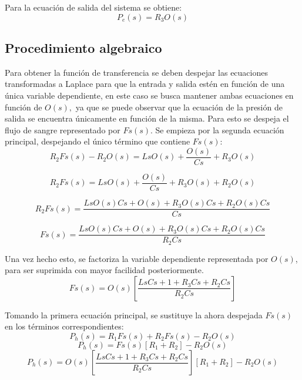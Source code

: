 \documentclass[letterpaper,11pt]{article}
\begin{document}
Para la ecuaci\'{o}n de salida del sistema se obtiene:%
\begin{equation*}
P_{e}(s)=R_{3}O(s)
\end{equation*}

\subsection{Procedimiento algebraico}

Para obtener la funci\'{o}n de transferencia se deben despejar las
ecuaciones transformadas a Laplace para que la entrada y salida est\'{e}n en
funci\'{o}n de una \'{u}nica variable dependiente, en este caso se busca
mantener ambas ecuaciones en funci\'{o}n de $O(s),$ ya que se puede observar
que la ecuaci\'{o}n de la presi\'{o}n de salida se encuentra \'{u}nicamente
en funci\'{o}n de la misma. Para esto se despeja el flujo de sangre
representado por $Fs(s)$. Se empieza por la segunda ecuaci\'{o}n principal,
despejando el \'{u}nico t\'{e}rmino que contiene $Fs(s)$:%
\begin{equation}
R_{2}Fs(s)-R_{2}O(s)=LsO(s)+\frac{O(s)}{Cs}+R_{3}O(s)
\end{equation}

\begin{equation*}
R_{2}Fs(s)=LsO(s)+\frac{O(s)}{Cs}+R_{3}O(s)+R_{2}O(s)
\end{equation*}

\begin{equation*}
R_{2}Fs(s)=\frac{LsO(s)Cs+O(s)+R_{3}O(s)Cs+R_{2}O(s)Cs}{Cs}
\end{equation*}

\begin{equation*}
Fs(s)=\frac{LsO(s)Cs+O(s)+R_{3}O(s)Cs+R_{2}O(s)Cs}{R_{2}Cs}
\end{equation*}

Una vez hecho esto, se factoriza la variable dependiente representada por $%
O(s)$, para ser suprimida con mayor facilidad posteriormente.%
\begin{equation*}
Fs(s)=O(s)\left[ \frac{LsCs+1+R_{3}Cs+R_{2}Cs}{R_{2}Cs}\right] 
\end{equation*}

Tomando la primera ecuaci\'{o}n principal, se sustituye la ahora despejada $%
Fs(s)$ en los t\'{e}rminos correspondientes:%
\begin{equation*}
P_{h}(s)=R_{1}Fs(s)+R_{2}Fs(s)-R_{2}O(s)
\end{equation*}%
\begin{equation*}
P_{h}(s)=Fs(s)\left[ R_{1}+R_{2}\right] -R_{2}O(s)
\end{equation*}%
\begin{equation*}
P_{h}(s)=O(s)\left[ \frac{LsCs+1+R_{3}Cs+R_{2}Cs}{R_{2}Cs}\right] \left[
R_{1}+R_{2}\right] -R_{2}O(s)
\end{equation*}
\end{document}
